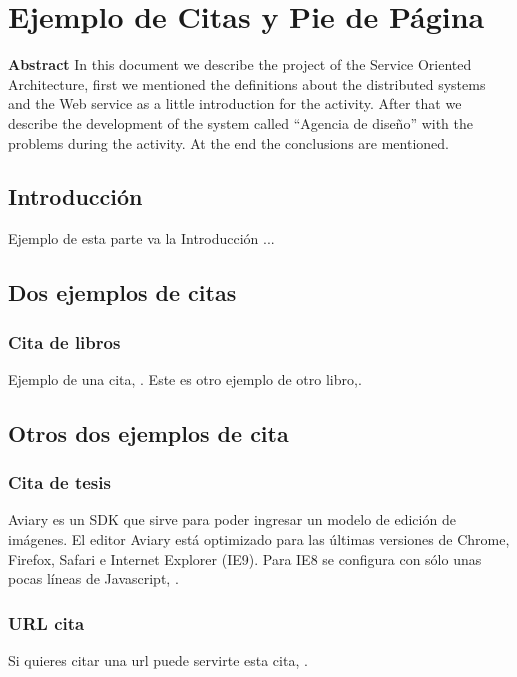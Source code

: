 \chapter{Ejemplo de Citas y Pie de Página}
\textbf{Abstract}
In this document we describe the project of the Service Oriented Architecture, first we mentioned the definitions about the distributed systems and the Web service as a little introduction for the activity. After that we describe the development of the system called “Agencia de diseño” with the problems during the activity. At the end the conclusions are mentioned.

\section{Introducción}

Ejemplo de esta parte va la Introducción ...



\section{Dos ejemplos de citas}

\subsection{Cita de libros}
Ejemplo de una cita, \cite{Scambray00}.
Este es otro ejemplo de otro libro,\cite{Kozierok05}.



\section{Otros dos ejemplos de cita}

\subsection{Cita de tesis}
Aviary es un SDK que sirve para poder ingresar un modelo de edición de imágenes. El editor Aviary está optimizado para las últimas versiones de Chrome, Firefox, Safari e Internet Explorer (IE9). Para IE8 se configura  con sólo unas pocas líneas de Javascript, \cite{Lopez05}.

\subsection{URL cita}
Si quieres citar una url puede servirte esta cita, \cite{urlCiteVilar2013}.

